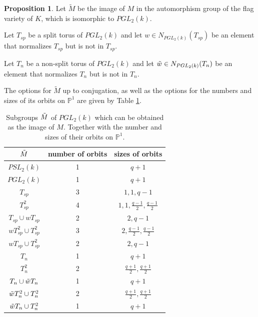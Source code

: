 \documentclass[12pt]{article}
\newcommand{\p}{\mathbb{P}}
\newcommand{\<}{\langle}
\renewcommand{\>}{\rangle}
\theoremstyle{plain}
\theoremstyle{definition}
\newtheorem{prop}[theorem]{Proposition}
\begin{document}
\begin{prop}\label{7.3}
    Let $\tilde{M}$ be the image of $M$ in the automorphism group of the flag variety of $K$, which is isomorphic to $PGL_2(k)$.

    Let $T_{sp}$ be a split torus of $PGL_2(k)$ and let $w\in N_{PGL_2(k)}(T_{sp})$ be an element that normalizes $T_{sp}$ but is not in $T_{sp}$. 

    Let $T_n$ be a non-split torus of $PGL_2(k)$ and let $\Tilde{w}\in N_{PGL_2(k)}(T_n)$ be an element that normalizes $T_n$ but is not in $T_n$. 
    

    The options for $\tilde{M}$ up to conjugation, as well as the options for the numbers and sizes of its orbits on $\mathbb{P}^1$ are given by Table \ref{tab:my_label}.
    \begin{table}[]
        \caption{Subgroups $\Tilde{M}$ of $PGL_2(k)$ which can be obtained as the image of $M$. Together with the number and sizes of their orbits on $\p^1$. }
            \begin{center}

    \begin{tabular}{|c|c|c|}
    \hline
    $\Tilde{M}$ & number of orbits & sizes of orbits \\
    \hline
        $PSL_2(k)$ &1 &$q+1$  \\
        \hline
        $PGL_2(k)$ &1 &$q+1$ \\
         \hline
         $T_{sp}$& 3 &$1,1,q-1$ \\
         \hline
          $T_{sp}^2$& 4 &$1,1,\frac{q-1}{2},\frac{q-1}{2}$\\
         \hline
         $T_{sp}\cup wT_{sp}$ & 2 & $2,q-1$\\
         \hline
         $wT_{sp}^2\cup T_{sp}^2$& 3 & $2,\frac{q-1}{2},\frac{q-1}{2}$\\
         \hline
         $wT_{sp}\cup T_{sp}^2$& 2 & $2,q-1$\\
         \hline
         
         \hline
         $T_n$& 1 &$q+1$ \\
         \hline
          $T_n^2$& 2 &$\frac{q+1}{2},\frac{q+1}{2}$\\
         \hline
         $T_n\cup \Tilde{w}T_n$&  1 & $q+1$\\
         \hline
         $\Tilde{w}T_n^2\cup T_n^2$& 2 & $\frac{q+1}{2},\frac{q+1}{2}$\\
         \hline
         $\Tilde{w}T_n\cup T_n^2$& 1 & $q+1$\\
         \hline

    \end{tabular}
    \label{tab:my_label}
            \end{center}

        \end{table}


        \end{prop}
\end{document}
